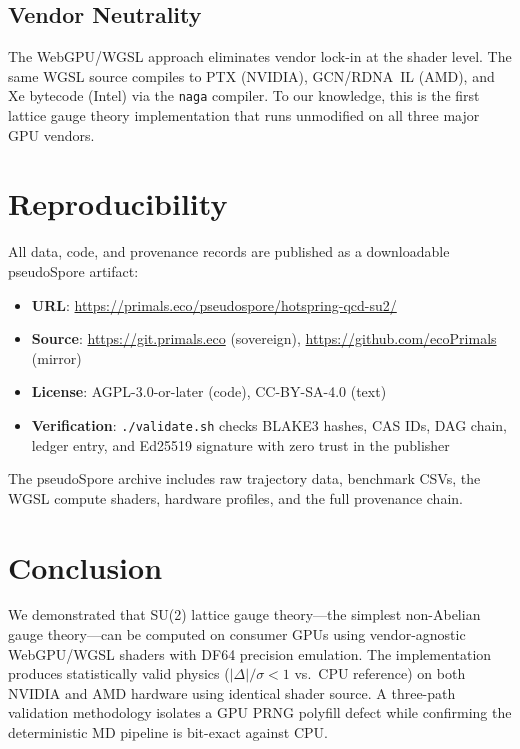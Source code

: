 \documentclass[aps,prl,twocolumn,superscriptaddress,showpacs]{revtex4-2}
\begin{document}
\subsection{Vendor Neutrality}

The WebGPU/WGSL approach eliminates vendor lock-in at the shader level.
The same WGSL source compiles to PTX (NVIDIA), GCN/RDNA~IL (AMD), and
Xe bytecode (Intel) via the \texttt{naga} compiler. To our knowledge,
this is the first lattice gauge theory implementation that runs
unmodified on all three major GPU vendors.

\section{Reproducibility}
\label{sec:reproducibility}

All data, code, and provenance records are published as a downloadable
pseudoSpore artifact:

\begin{itemize}
\item \textbf{URL}: \url{https://primals.eco/pseudospore/hotspring-qcd-su2/}
\item \textbf{Source}: \url{https://git.primals.eco} (sovereign),
  \url{https://github.com/ecoPrimals} (mirror)
\item \textbf{License}: AGPL-3.0-or-later (code), CC-BY-SA-4.0 (text)
\item \textbf{Verification}: \texttt{./validate.sh} checks BLAKE3
  hashes, CAS IDs, DAG chain, ledger entry, and Ed25519 signature with
  zero trust in the publisher
\end{itemize}

The pseudoSpore archive includes raw trajectory data, benchmark CSVs,
the WGSL compute shaders, hardware profiles, and the full provenance
chain.

\section{Conclusion}
\label{sec:conclusion}

We demonstrated that SU(2) lattice gauge theory---the simplest
non-Abelian gauge theory---can be computed on consumer GPUs using
vendor-agnostic WebGPU/WGSL shaders with DF64 precision emulation.
The implementation produces statistically valid physics
($|\Delta|/\sigma < 1$ vs.\ CPU reference) on both NVIDIA and AMD
hardware using identical shader source. A three-path validation
methodology isolates a GPU PRNG polyfill defect while confirming the
deterministic MD pipeline is bit-exact against CPU.
\end{document}
